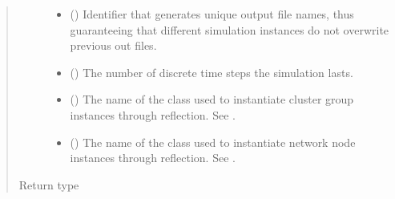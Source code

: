 \documentclass[letterpaper,10pt,english]{sphinxmanual}
\begin{document}
\begin{fulllineitems}
\begin{fulllineitems}
\begin{quote}
\begin{description}
\begin{itemize}
\item {} 
 () \textendash{} Identifier that generates unique output file names,
thus guaranteeing that different simulation instances do not
overwrite previous out files.

\item {} 
 () \textendash{} The number of discrete time steps the simulation lasts.

\item {} 
 () \textendash{} The name of the class used to instantiate cluster group
instances through reflection. See {\hyperref[\detokenize{app.domain:module-app.domain.cluster_groups}]{}}.

\item {} 
 () \textendash{} The name of the class used to instantiate network node
instances through reflection. See {\hyperref[\detokenize{app.domain:module-app.domain.network_nodes}]{}}.

\end{itemize}

\item[{Return type}] \leavevmode
{}

\end{description}\end{quote}

\end{fulllineitems}



\end{fulllineitems}
\end{document}
